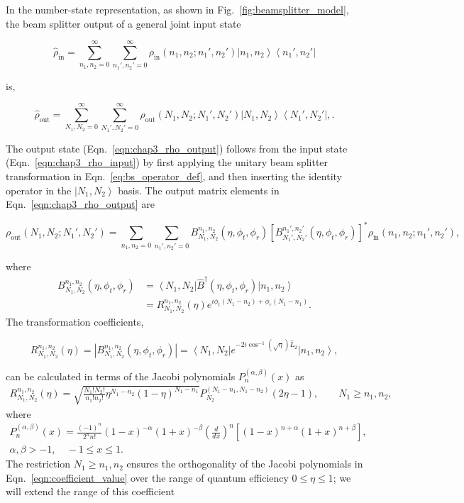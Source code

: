\documentclass[aps,twocolumn,secnumarabic,amsmath,amssymb,pra,groupedaddress,
showpacs, showkeys]{revtex4-1}
\newcommand{\bra}[1]{\left\langle #1 \right|}
\newcommand{\ket}[1]{\left|#1\right\rangle}
\newcommand{\pna}[1]{\left(#1\right)}
\newcommand{\pnb}[1]{\left[#1\right]}
\newcommand{\eqn}[1]{
\begin{equation}
	#1
\end{equation}
}
\newcommand{\abs}[1]{\left|#1\right|}
\begin{document}
In the number-state representation, as shown in
Fig.~\ref{fig:beamsplitter_model}, the beam splitter output of a general joint
input state
\eqn{
\hat{\rho}_{\textrm{in}}=\sum_{n_1,n_2=0}^{\infty}\sum_{n_1',n_2'=0}^{\infty}
\rho_{\textrm{in}}\pna{n_1,n_2;n_1',n_2'}\ket{n_1,n_2}\bra{n_1',n_2'} \label{eqn:chap3_rho_input}
}
is,
\eqn{
\hat{\rho}_{\textrm{out}}=\sum_{N_1,N_2=0}^{\infty}\sum_{N_1',N_2'=0}^{\infty}
\rho_{\textrm{out}}\pna{N_1,N_2;N_1',N_2'}\ket{N_1,N_2}\bra{N_1',N_2'},\label{eqn:chap3_rho_output}.
}
The output state (Eqn.~\ref{eqn:chap3_rho_output}) follows from the input state
(Eqn.~\ref{eqn:chap3_rho_input}) by first applying the unitary beam splitter
transformation in Eqn.~\ref{eq:bs_operator_def}, and then inserting the
identity operator in the $\ket{N_1,N_2}$ basis. The output matrix elements in
Eqn.~\ref{eqn:chap3_rho_output} are
\eqn{\rho_{\textrm{out}}\pna{N_1,N_2;N_1',N_2'}=\sum_{n_1,n_2=0}\sum_{n_1',n_2'=0} B_{N_1,N_2}^{n_1,n_2}\pna{\eta,\phi_t,\phi_r}\pnb{B_{N_1',N_2'}^{n_1',n_2'}\pna{\eta,\phi_t,\phi_r}}^{*}\rho_{\textrm{in}}\pna{n_1,n_2;n_1',n_2'},\label{eq:rho_output}
}
where
\begin{align}
B_{N_1,N_2}^{n_1,n_2}\pna{\eta,\phi_t,\phi_r} &= \bra{N_1,N_2}\hat{B}^{\dagger}\pna{\eta,\phi_t,\phi_r}\ket{n_1,n_2}\nonumber \\
& =R_{N_1,N_2}^{n_1,n_2}\pna{\eta} e^{i{\phi_t\pna{N_1-n_2}+\phi_r\pna{N_1-n_1}}}.
\end{align}
The transformation coefficients,
\eqn{
R_{N_1,N_2}^{n_1,n_2}\pna{\eta}=\abs{B_{N_1,N_2}^{n_1,n_2}\pna{\eta,\phi_t,\phi_r}}=\bra{N_1,N_2}e^{-2i\cos^{-1}\pna{\sqrt{\eta}}\hat{L}_2}\ket{n_1,n_2},
}
can be calculated in terms of the Jacobi polynomials $P_n^{\pna{\alpha,\beta}}\pna{x}$ as
\begin{align}
	R_{N_1,N_2}^{n_1,n_2}\pna{\eta}=\sqrt{\frac{N_1!N_2!}{n_1!n_2!} \eta^{N_1-n_2}\pna{1-\eta}^{N_1-n_1}}P_{N_2}^{\pna{N_1-n_1,N_1-n_2}}\pna{2\eta-1}, \qquad N_1\geq n_1,n_2,  \label{eqn:coefficient_value}
\end{align}
where
\begin{align}
P_n^{\pna{\alpha,\beta}}\pna{x} = \frac{\pna{-1}^n}{2^n n!}\pna{1-x}^{-\alpha}\pna{1+x}^{-\beta}\pna{\frac{d}{dx}}^n\pnb{\pna{1-x}^{n+\alpha}\pna{1+x}^{n+\beta}},\nonumber \\
\alpha,\beta >-1, \quad -1\leq x \leq 1.
\end{align}
The restriction $N_1\geq n_1, n_2$ ensures the orthogonality of the Jacobi
polynomials in Eqn.~\ref{eqn:coefficient_value} over the range of quantum
efficiency $0\leq \eta \leq 1$; we will extend the range of this coefficient
\end{document}
